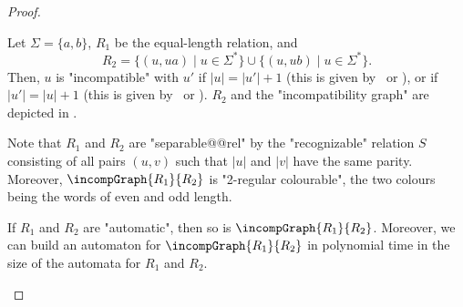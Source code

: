 \begin{proof}
\begin{example}%
    \AP\label{ex:equal-length-plusone}%
    Let $\Sigma = \{a,b\}$, $R_1$ be the equal-length relation,
    and
    \[
        R_2 = \{(u, ua) \mid u \in \Sigma^*\} \cup \{(u, ub) \mid u \in \Sigma^*\}.
    \]
    Then, $u$ is "incompatible" with $u'$ if $|u| = |u'|+1$ (this is given by \compL~or \compR),
    or if $|u'| = |u|+1$ (this is given by \compLpr~or \compRpr).
    $R_2$ and the "incompatibility graph" are depicted in .
    \begin{marginfigure}%
        \centering
        \begin{tikzpicture}
            
        \end{tikzpicture}
        \caption{\AP\label{fig:equal-length-plusone-relation}%
            The relation $R_2$ of ,
            restricted to words of length at most 2.
        }
    \end{marginfigure}%
    \begin{marginfigure}%
        \centering
        \begin{tikzpicture}
            
        \end{tikzpicture}
        \caption{\AP\label{fig:equal-length-plusone-incompatibility}%
            Incompatibility graph $\incompGraph{R_1}{R_2}$ and its "2-regular colouring".%
        }
    \end{marginfigure}%
    Note that $R_1$ and $R_2$ are "separable@@rel" by the "recognizable" relation
    $S$ consisting of all pairs $(u,v)$ such that $|u|$ and $|v|$ have the same parity.
    Moreover, $\incompGraph{R_1}{R_2}$ is "2-regular colourable", the two colours being
    the words of even and odd length.
\end{example}

\begin{lemma}
    \AP\label{lem:incomp-is-automatic}
    If $R_1$ and $R_2$ are "automatic", then so is $\incompGraph{R_1}{R_2}$.
    Moreover, we can build an automaton for $\incompGraph{R_1}{R_2}$ in polynomial time in the size of the automata for $R_1$ and $R_2$.
\end{lemma}


\end{proof}
